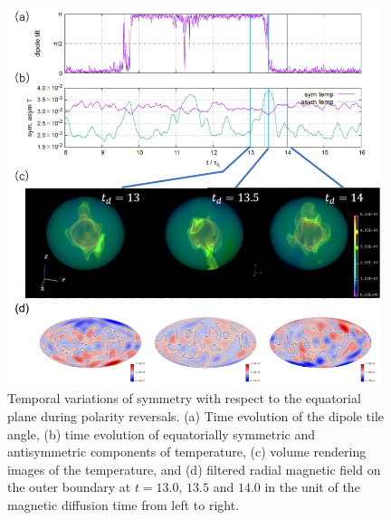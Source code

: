 \begin{figure}[ht]
\begin{center}
\includegraphics*[width=109mm]{Figures/temp_pvr_vrms_matsui_run_2.png}
\end{center}
\caption{
Temporal variations of symmetry with respect to the equatorial plane during polarity reversals.
(a) Time evolution of the dipole tile angle, (b) time evolution of equatorially symmetric and antisymmetric components of temperature, (c) volume rendering images of the temperature, and (d) filtered radial magnetic field on the outer boundary at $t = 13.0$, $13.5$ and $14.0$ in the unit of the magnetic diffusion time from left to right.
}
\label{fig:temperature_rendering}
\end{figure}